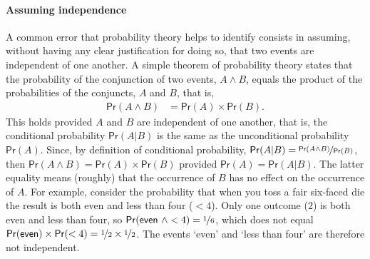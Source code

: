 \documentclass{article}
\newcommand{\pr}{\mathsf{Pr}}
\begin{document}
\paragraph{Assuming independence}

A common error that probability theory helps to identify consists in assuming, without having any clear justification for doing so, that two events are independent of one another.  
%
A simple theorem of probability theory states that the probability of the conjunction of two events, $A\wedge B$, equals the product of the probabilities of the conjuncts, $A$ and $B$, that is, 
%
\begin{align*}
\pr(A \wedge B) & = \pr(A)\times \pr(B).
\end{align*}
%
\noindent This holds provided  $A$ and $B$ are independent of one another, that is, the conditional probability $\pr(A | B)$ is the same as the unconditional probability $\pr(A)$. Since, by definition of conditional probability, $\pr(A \vert B)=\nicefrac{\pr(A \wedge B)}{\pr(B)}$, then
$\pr(A \wedge B)=\pr(A)\times \pr(B)$
provided $\pr(A)=\pr(A \vert B)$. The latter equality means (roughly) that the occurrence of $B$ has no effect on the occurrence of $A$. For example, consider the probability that when you toss a fair six-faced die the result is both  even and less than four ($<4$).  Only one outcome ($2$) is both even and less than four, so $\pr(\textsf{even }\wedge <4)=\nicefrac{1}{6}$, which does not equal $\pr(\textsf{even}) \times\pr(<4) =  \nicefrac{1}{2}\times \nicefrac{1}{2}$.  The events `even' and `less than four' are therefore not independent. 
\end{document}
